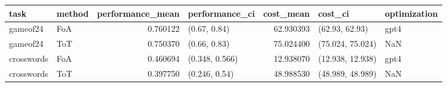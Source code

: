\begin{tabular}{llrlrll}
\toprule
task & method & performance_mean & performance_ci & cost_mean & cost_ci & optimization \\
\midrule
gameof24 & FoA & 0.760122 & (0.67, 0.84) & 62.930393 & (62.93, 62.93) & gpt4 \\
gameof24 & ToT & 0.750370 & (0.66, 0.83) & 75.024400 & (75.024, 75.024) & NaN \\
crosswords & FoA & 0.460694 & (0.348, 0.566) & 12.938070 & (12.938, 12.938) & gpt4 \\
crosswords & ToT & 0.397750 & (0.246, 0.54) & 48.988530 & (48.989, 48.989) & NaN \\
\bottomrule
\end{tabular}
